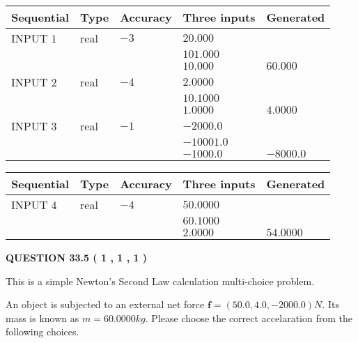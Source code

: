 \documentclass[12pt]{article}
\begin{document}
  
\noindent\begin{tabular}{|l|l|l|l|l|}
\hline
 Sequential & Type & Accuracy & Three inputs & Generated \\ 
\hline
 
 
  INPUT $            1 $ & real & $           -3  $ & $
 20.000
  $ & \\
  & & &  $
 101.000
  $ & \\
  & & &  $
 10.000
 $ & $ 60.000 $ 
 \\  \hline  
 
 
  INPUT $            2 $ & real & $           -4  $ & $
 2.0000
  $ & \\
  & & &  $
 10.1000
  $ & \\
  & & &  $
 1.0000
 $ & $ 4.0000 $ 
 \\  \hline  
 
 
  INPUT $            3 $ & real & $           -1  $ & $
 -2000.0
  $ & \\
  & & &  $
 -10001.0
  $ & \\
  & & &  $
 -1000.0
 $ & $ -8000.0 $ 
 \\  \hline  
 \end{tabular}
   
   
  
  
\noindent\begin{tabular}{|l|l|l|l|l|}
\hline
 Sequential & Type & Accuracy & Three inputs & Generated \\ 
\hline
 
 
  INPUT $            4 $ & real & $           -4  $ & $
 50.0000
  $ & \\
  & & &  $
 60.1000
  $ & \\
  & & &  $
 2.0000
 $ & $ 54.0000 $ 
 \\  \hline  
 \end{tabular}
   
   
  
\vspace{0.2in}
  
{\textbf{\Large{QUESTION
33.5 
 (           1 ,           1 ,           1 )
}}}
  
  


\noindent{}
This is a simple Newton's Second Law calculation multi-choice problem.  
\noindent{}


 
 
An object is subjected to an external net force $\mathbf{f}=
(50.0 , 4.0 , -2000.0) N$.
Its mass is known as $m= %
60.0000 kg$. Please choose the
correct accelaration from the following choices.
 
\end{document}
